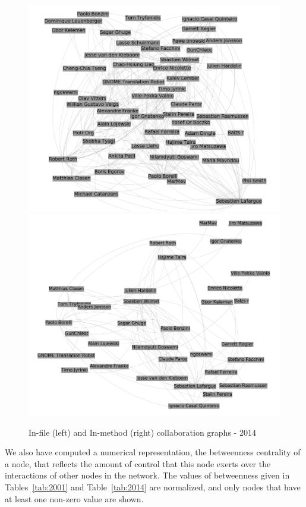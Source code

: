 \documentclass[a4paper]{article}
\begin{document}
\begin{figure}[h!]
\begin{center}
\includegraphics[scale=0.17]{g2014files.png} 
\includegraphics[scale=0.17]{g2014methods.png}
\caption{In-file (left) and In-method (right) collaboration graphs - 2014}
\label{fig:2014}
\end{center}
\end{figure}

We also have computed a numerical representation, the betweenness centrality of a node,
that reflects the amount of control that
this node exerts over the interactions of other nodes in the network. 
The values of betweenness given in Tables~\ref{tab:2001} and Table~\ref{tab:2014} 
are normalized, and only nodes that have at least one non-zero value are shown.
\end{document}
